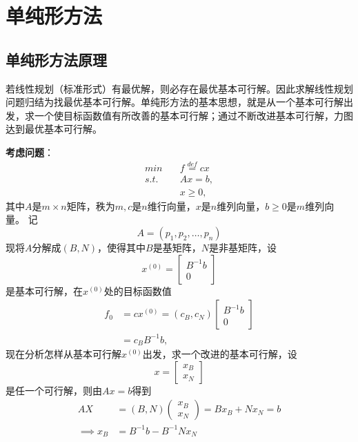 \section{单纯形方法} 
\subsection*{单纯形方法原理}
若线性规划（标准形式）有最优解，则必存在最优基本可行解。因此求解线性规划问题归结为找最优基本可行解。单纯形方法的基本思想，就是从一个基本可行解出发，求一个使目标函数值有所改善的基本可行解；通过不断改进基本可行解，力图达到最优基本可行解。

\textbf{考虑问题}：
\begin{equation}
	\begin{aligned}
	min \quad & f \overset{def}{=} cx \\
	s.t. \quad & Ax = b, \\
	\quad & x \geq 0,
	\end{aligned}
\end{equation}
其中$A$是$m\times n$矩阵，秩为$m,c$是$n$维行向量，$x$是$n$维列向量，$b\geq 0$是$m$维列向量。
记
\begin{equation}
	A = (p_1,p_2,\dots ,p_n)
\end{equation}
现将$A$分解成$(B,N)$，使得其中$B$是基矩阵，$N$是非基矩阵，设
\begin{equation}
	x^{(0)} = 
	\begin{bmatrix}
	B^{-1}b \\ 0
	\end{bmatrix}
\end{equation}
是基本可行解，在$x^{(0)}$处的目标函数值
\begin{equation}
	\begin{aligned}
	f_0 &= cx^{(0)} = (c_B,c_N) \begin{bmatrix} B^{-1}b \\ 0 \end{bmatrix} \\
	&= c_BB^{-1}b,
	\end{aligned} 
\end{equation}
现在分析怎样从基本可行解$x^{(0)}$出发，求一个改进的基本可行解，设
\begin{equation}
	x = \begin{bmatrix} x_B \\ x_N \end{bmatrix}
\end{equation}
是任一个可行解，则由$Ax = b$得到 
\begin{equation}
	\begin{aligned}
	AX &= (B, N)\begin{pmatrix}x_B \\ x_N \end{pmatrix} = Bx_B + Nx_N = b \\ 
	\implies x_B &= B^{-1}b - B^{-1}Nx_N 
	\end{aligned}
\end{equation}
